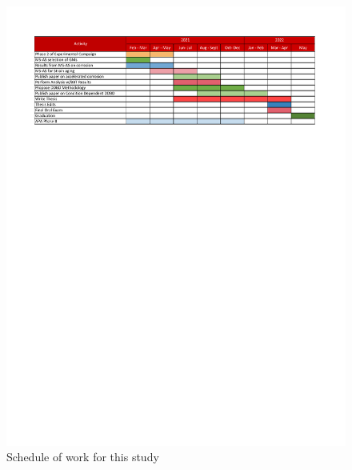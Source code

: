 \begin{figure}[htbp]
	\centering
    \includegraphics[width=1.0\textwidth]{VAC Prelim 2.0/Chapter-5/figs/Plan of Research.pdf}
	\caption{Schedule of work for this study}
	\label{fig:Schedule}
\end{figure}
